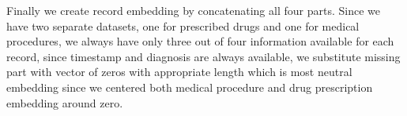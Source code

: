 Finally we create record embedding by concatenating all four parts. Since we have two separate datasets, one for prescribed drugs and one for medical procedures, we always have only three out of four information available for each record, since timestamp and diagnosis are always available, we substitute missing part with vector of zeros with appropriate length which is most neutral embedding since we centered both medical procedure and drug prescription embedding around zero.
